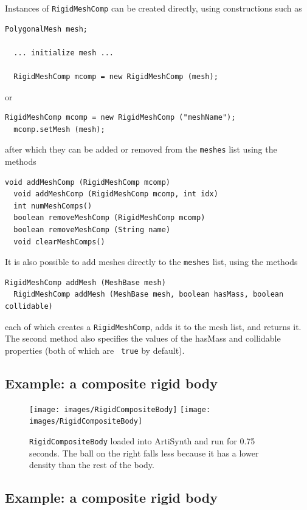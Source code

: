 Instances of {\tt RigidMeshComp} can be created directly, using
constructions such as
%
\begin{lstlisting}[]
  PolygonalMesh mesh;

  ... initialize mesh ...

  RigidMeshComp mcomp = new RigidMeshComp (mesh);
\end{lstlisting}
%
or
%
\begin{lstlisting}[]
  RigidMeshComp mcomp = new RigidMeshComp ("meshName");
  mcomp.setMesh (mesh);
\end{lstlisting}
%
after which they can be added or removed from the {\tt meshes} list
using the methods
%
\begin{lstlisting}[]
  void addMeshComp (RigidMeshComp mcomp)
  void addMeshComp (RigidMeshComp mcomp, int idx)
  int numMeshComps()
  boolean removeMeshComp (RigidMeshComp mcomp)
  boolean removeMeshComp (String name)
  void clearMeshComps()
\end{lstlisting}
%
It is also possible to add meshes directly to the {\tt meshes} list,
using the methods
%
\begin{lstlisting}[]
  RigidMeshComp addMesh (MeshBase mesh)
  RigidMeshComp addMesh (MeshBase mesh, boolean hasMass, boolean collidable)
\end{lstlisting}
%
each of which creates a {\tt RigidMeshComp}, adds it to the mesh list,
and returns it.  The second method also specifies the values of the
{\sf hasMass} and {\sf collidable} properties (both of which are {\tt
true} by default).

\iflatexml
\subsection{Example: a composite rigid body}
\fi

\begin{figure}[ht]
\begin{center}
\iflatexml
 \texttt{[image: images/RigidCompositeBody]}
\else
 \texttt{[image: images/RigidCompositeBody]}
\fi
\end{center}
\caption{{\tt RigidCompositeBody} loaded into ArtiSynth and run for 0.75 seconds.
The ball on the right falls less because it has a lower
density than the rest of the body.}
\label{RigidCompositeBody:fig}
\end{figure}

\iflatexml
\else
\subsection{Example: a composite rigid body}
\fi

